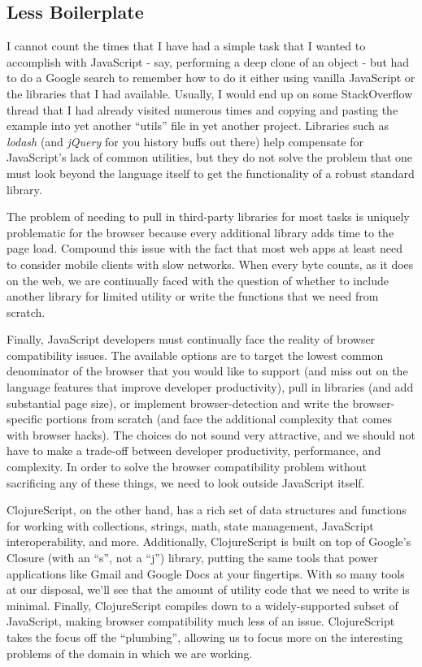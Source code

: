 \documentclass[10pt,twoside,openright]{memoir}
\begin{document}
\subsection{Less Boilerplate}

I cannot count the times that I have had a simple task that I wanted to
accomplish with JavaScript - say, performing a deep clone of an object -
but had to do a Google search to remember how to do it either using
vanilla JavaScript or the libraries that I had available. Usually, I
would end up on some StackOverflow thread that I had already visited
numerous times and copying and pasting the example into yet another
``utils'' file in yet another project. Libraries such as \emph{lodash}
(and \emph{jQuery} for you history buffs out there) help compensate for
JavaScript's lack of common utilities, but they do not solve the problem
that one must look beyond the language itself to get the functionality
of a robust standard library.

The problem of needing to pull in third-party libraries for most tasks
is uniquely problematic for the browser because every additional library
adds time to the page load. Compound this issue with the fact that most
web apps at least need to consider mobile clients with slow networks.
When every byte counts, as it does on the web, we are continually faced
with the question of whether to include another library for limited
utility or write the functions that we need from scratch.

Finally, JavaScript developers must continually face the reality of
browser compatibility issues. The available options are to target the
lowest common denominator of the browser that you would like to support
(and miss out on the language features that improve developer
productivity), pull in libraries (and add substantial page size), or
implement browser-detection and write the browser-specific portions from
scratch (and face the additional complexity that comes with browser
hacks). The choices do not sound very attractive, and we should not have
to make a trade-off between developer productivity, performance, and
complexity. In order to solve the browser compatibility problem without
sacrificing any of these things, we need to look outside JavaScript
itself.

ClojureScript, on the other hand, has a rich set of data structures and
functions for working with collections, strings, math, state management,
JavaScript interoperability, and more. Additionally, ClojureScript is
built on top of Google's Closure (with an ``s'', not a ``j'') library,
putting the same tools that power applications like Gmail and Google
Docs at your fingertips. With so many tools at our disposal, we'll see
that the amount of utility code that we need to write is minimal.
Finally, ClojureScript compiles down to a widely-supported subset of
JavaScript, making browser compatibility much less of an issue.
ClojureScript takes the focus off the ``plumbing'', allowing us to focus
more on the interesting problems of the domain in which we are working.
\end{document}
